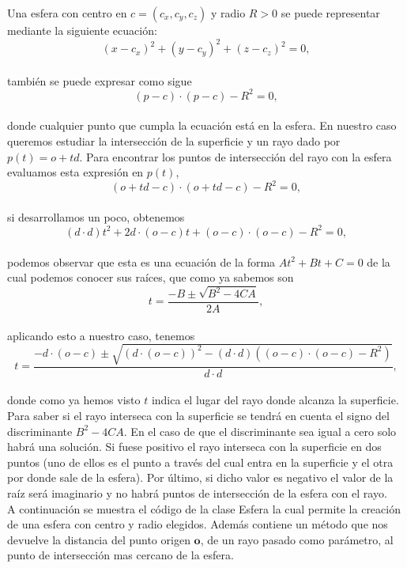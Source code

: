 Una esfera con centro en $c = (c_x, c_y, c_z)$ y radio $R>0$ se puede representar mediante la siguiente ecuación:
${ }$\\
\[
	(x-c_x)^2 + (y-c_y)^2 + (z-c_z)^2 = 0,
\]
${ }$\\
también se puede expresar como sigue
${ }$\\
\[
	(p-c)\cdot(p-c) - R^2 = 0,
\]
${ }$\\
donde cualquier punto que cumpla la ecuación está en la esfera. En nuestro caso queremos estudiar la intersección de la superficie y un rayo dado por $p(t) = o + td$. Para encontrar los puntos de intersección del rayo con la esfera evaluamos esta expresión en $p(t)$,
${ }$\\
\[
	(o+td-c)\cdot(o+td-c) - R^2 = 0,
\]
${ }$\\
si desarrollamos un poco, obtenemos
${ }$\\
\[
	(d\cdot d)t^2 + 2d\cdot (o-c)t + (o-c)\cdot(o-c) - R^2 = 0,
\]
${ }$\\
podemos observar que esta es una ecuación de la forma $At^2+Bt+C=0$ de la cual podemos conocer sus raíces, que como ya sabemos son
${ }$\\
\[
	t = \frac{-B\pm \sqrt{B^2-4CA}}{2A},
\]
${ }$\\
aplicando esto a nuestro caso, tenemos
${ }$\\
\[
	t = \frac{-d\cdot (o-c) \pm \sqrt{(d\cdot (o-c))^2 - (d\cdot d)((o-c)\cdot(o-c)-R^2)}}{d\cdot d},
\]
${ }$\\
donde como ya hemos visto $t$ indica el lugar del rayo donde alcanza la superficie.
${ }$\\

Para saber si el rayo interseca con la superficie se tendrá en cuenta el signo del discriminante $B^2-4CA$. En el caso de que el discriminante sea igual a cero solo habrá una solución. Si fuese positivo el rayo interseca con la superficie en dos puntos (uno de ellos es el punto a través del cual entra en la superficie y el otra por donde sale de la esfera). Por último, si dicho valor es negativo el valor de la raíz será imaginario y no habrá puntos de intersección de la esfera con el rayo.
${ }$\\
	
A continuación se muestra el código de la clase Esfera la cual permite la creación de una esfera con centro y radio elegidos. Además contiene un método que nos devuelve la distancia del punto origen $\textbf{o}$, de un rayo pasado como parámetro, al punto de intersección mas cercano de la esfera.
${ }$\\

